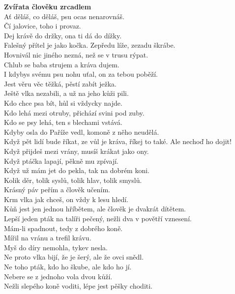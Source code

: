\begin{multicols}{\value{columnsgames}}
\noindent
{\large\bf Zvířata člověku zrcadlem}\\[1 mm]
Ať děláš, co děláš, psu ocas nenarovnáš.\\
Čí jalovice, toho i provaz.\\
Dej krávě do držky, ona ti dá do dížky.\\
Falešný přítel je jako kočka. Zepředu líže, zezadu škrábe.\\
Hovnivál nic jiného nezná, než se v trusu rýpat.\\
Chlub se baba strujem a kráva dujem.\\
I kdybys svému psu nohu uťal, on za tebou poběží.\\
Jest věru věc těžká, pěstí zabít ježka.\\
Ještě vlka nezabili, a už na jeho kůži pili.\\
Kdo chce psa bít, hůl si vždycky najde.\\
Kdo lehá mezi otruby, přichází svini pod zuby.\\
Kdo se psy lehá, ten s blechami vstává.\\
Kdyby osla do Paříže vedl, komoně z něho neudělá.\\
Když pět lidí bude říkat, ze vůl je kráva, říkej to také. Ale
nechoď ho dojit!\\
Když přijdeš mezi vrány, musíš krákat jako ony.\\
Když ptáčka lapají, pěkně mu zpívají.\\
Když už mám jet do pekla, tak na dobrém koni.\\
Kolik děr, tolik syslů, tolik hlav, tolik smyslů.\\
Krásný páv peřím a člověk učením.\\
Krm vlka jak chceš, on vždy k lesu hledí.\\
Kůň jest jen jednou hříbětem, ale člověk je dvakrát dítětem.\\
Lepší jeden pták na talíři pečený, nežli dva v povětří vznesení.\\
Mám-li spadnout, tedy z dobrého koně.\\
Mířil na vránu a trefil krávu.\\
Myš do díry nemohla, tykev nesla.\\
Ne proto vlka bijí, že je šerý, ale že ovci snědl.\\
Ne toho pták, kdo ho škube, ale kdo ho jí.\\
Nebere se z jednoho vola dvou kůží.\\
Nežli slepého koně voditi, lépe jest pěšky choditi.\\

\end{multicols}
